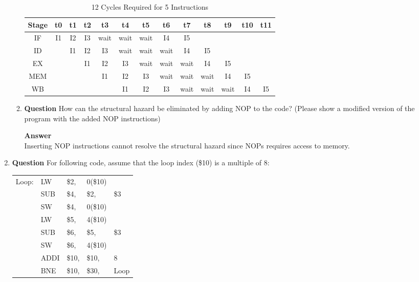 \documentclass[paper=usletter, fontsize=12pt]{article}
\begin{document}
\begin{enumerate}
\begin{enumerate}
            \begin{table}[h]
                \caption{12 Cycles Required for 5 Instructions}
                \centering
                \begin{tabular*}{450pt}{@{\extracolsep{\fill}} c|cccccccccccc}

                \textbf{Stage} & \textbf{t0} & \textbf{t1} & \textbf{t2} & \textbf{t3} & \textbf{t4} & \textbf{t5} & \textbf{t6} & \textbf{t7} & \textbf{t8} & \textbf{t9} & \textbf{t10} & \textbf{t11} \\
                \hline
                IF & I1 & I2 & I3 & wait & wait & wait & I4 & I5 & & & & \\
                ID & & I1 & I2 & I3 & wait & wait & wait & I4 & I5 & & & \\
                EX & & & I1 & I2 & I3 & wait & wait & wait & I4 & I5 & & \\
                MEM & & & & I1 & I2 & I3 & wait & wait & wait & I4 & I5 & \\
                WB & & & & & I1 & I2 & I3 & wait & wait & wait & I4 & I5 \\
                \end{tabular*}
            \end{table}

            \item \textbf{Question}
            How can the structural hazard be eliminated by adding NOP to the code? (Please show a modified version of the program with the added NOP instructions)

            \textbf{Answer} \\
            Inserting NOP instructions cannot resolve the structural hazard since NOPs requires access to memory.

        \end{enumerate}
        \newpage

        \item \textbf{Question}
        For following code, assume that the loop index (\$10) is a multiple of 8:

        \begin{table}[h]
            \centering
            \begin{tabular*}{200pt}{@{\extracolsep{\fill}} lllll}

            Loop: & LW & \$2, & 0(\$10) & \\
                & SUB & \$4, & \$2, & \$3 \\
                & SW & \$4, & 0(\$10) & \\
                & LW & \$5, & 4(\$10) & \\
                & SUB & \$6, & \$5, & \$3 \\
                & SW & \$6, & 4(\$10) & \\
                & ADDI & \$10, & \$10, & 8 \\
                & BNE & \$10, & \$30, & Loop \\
            \end{tabular*}
        \end{table}


\end{enumerate}
\end{document}
